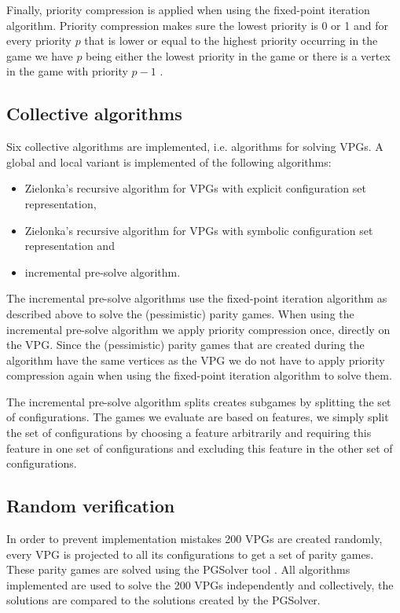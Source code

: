 Finally, priority compression is applied when using the fixed-point iteration algorithm. Priority compression makes sure the lowest priority is 0 or 1 and for every priority $p$ that is lower or equal to the highest priority occurring in the game we have $p$ being either the lowest priority in the game or there is a vertex in the game with priority $p-1$ \cite{FPITE,friedmanPG}.

\subsection{Collective algorithms}
Six collective algorithms are implemented, i.e. algorithms for solving VPGs. A global and local variant is implemented of the following algorithms:
\begin{itemize}
	\item Zielonka's recursive algorithm for VPGs with explicit configuration set representation,
	\item Zielonka's recursive algorithm for VPGs with symbolic configuration set representation and
	\item incremental pre-solve algorithm.
\end{itemize}
The incremental pre-solve algorithms use the fixed-point iteration algorithm as described above to solve the (pessimistic) parity games. When using the incremental pre-solve algorithm we apply priority compression once, directly on the VPG. Since the (pessimistic) parity games that are created during the algorithm have the same vertices as the VPG we do not have to apply priority compression again when using the fixed-point iteration algorithm to solve them.

The incremental pre-solve algorithm splits creates subgames by splitting the set of configurations. The games we evaluate are based on features, we simply split the set of configurations by choosing a feature arbitrarily and requiring this feature in one set of configurations and excluding this feature in the other set of configurations.
\subsection{Random verification}
In order to prevent implementation mistakes 200 VPGs are created randomly, every VPG is projected to all its configurations to get a set of parity games. These parity games are solved using the PGSolver tool \cite{Friedmann2010ThePC}. All algorithms implemented are used to solve the 200 VPGs independently and collectively, the solutions are compared to the solutions created by the PGSolver.